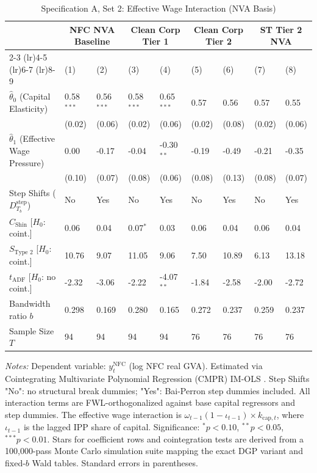 \begin{table}[h!]
\centering
\caption{Specification A, Set 2: Effective Wage Interaction (NVA Basis)}
\label{tab:specA_set2_nva_main}
\small
\begin{tabular}{p{4.2cm}p{1.2cm}p{1.2cm}p{1.2cm}p{1.2cm}p{1.2cm}p{1.2cm}p{1.2cm}p{1.2cm}}
\toprule
 & \multicolumn{2}{c}{NFC NVA Baseline} & \multicolumn{2}{c}{Clean Corp Tier 1} & \multicolumn{2}{c}{Clean Corp Tier 2} & \multicolumn{2}{c}{ST Tier 2 NVA} \\
\cmidrule(lr){2-3} \cmidrule(lr){4-5} \cmidrule(lr){6-7} \cmidrule(lr){8-9}
 & (1) & (2) & (3) & (4) & (5) & (6) & (7) & (8) \\
\midrule
$\hat{\theta}_0$ (Capital Elasticity) & 0.58$^{***}$ & 0.56$^{***}$ & 0.58$^{***}$ & 0.65$^{***}$ & 0.57 & 0.56 & 0.57 & 0.55 \\
 & (0.02) & (0.06) & (0.02) & (0.06) & (0.02) & (0.08) & (0.02) & (0.06) \\
$\hat{\theta}_1$ (Effective Wage Pressure) & 0.00 & -0.17 & -0.04 & -0.30$^{**}$ & -0.19 & -0.49 & -0.21 & -0.35 \\
 & (0.10) & (0.07) & (0.08) & (0.06) & (0.08) & (0.13) & (0.08) & (0.07) \\
\midrule
Step Shifts ($D_{T_b}^{\text{step}}$) & No & Yes & No & Yes & No & Yes & No & Yes \\
$C_{\text{Shin}}$ [$H_0$: coint.] & 0.06 & 0.04 & 0.07$^{*}$ & 0.03 & 0.06 & 0.04 & 0.06 & 0.04 \\
$S_{\text{Type 2}}$ [$H_0$: coint.] & 10.76 & 9.07 & 11.05 & 9.06 & 7.50 & 10.89 & 6.13 & 13.18 \\
$t_{\text{ADF}}$ [$H_0$: no coint.] & -2.32 & -3.06 & -2.22 & -4.07$^{**}$ & -1.84 & -2.58 & -2.00 & -2.72 \\
Bandwidth ratio $b$ & 0.298 & 0.169 & 0.280 & 0.165 & 0.272 & 0.237 & 0.259 & 0.237 \\
Sample Size $T$ & 94 & 94 & 94 & 94 & 76 & 76 & 76 & 76 \\
\bottomrule
\end{tabular}
\begin{minipage}{\textwidth}
\scriptsize
\textit{Notes:} Dependent variable: $y_t^{\text{NFC}}$ (log NFC real GVA). Estimated via Cointegrating Multivariate Polynomial Regression (CMPR) IM-OLS \citep{VogelsangWagner2024}. Step Shifts "No": no structural break dummies; "Yes": Bai-Perron step dummies included. All interaction terms are FWL-orthogonalized against base capital regressors and step dummies. The effective wage interaction is $\omega_{t-1}(1-\iota_{t-1}) \times k_{\text{cap},t}$, where $\iota_{t-1}$ is the lagged IPP share of capital. Significance: $^*p<0.10$, $^{**}p<0.05$, $^{***}p<0.01$. Stars for coefficient rows and cointegration tests are derived from a 100,000-pass Monte Carlo simulation suite mapping the exact DGP variant and fixed-$b$ Wald tables. Standard errors in parentheses.
\end{minipage}
\end{table}
